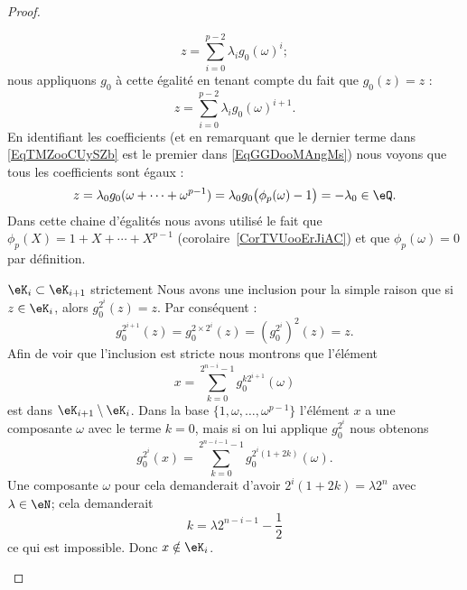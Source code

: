 \begin{proof}
\begin{subproof}
\begin{subproof}
			\begin{equation}    \label{EqTMZooCUySZb}
				z=\sum_{i=0}^{p-2}\lambda_i g_0(\omega)^i;
			\end{equation}
			nous appliquons \( g_0\) à cette égalité en tenant compte du fait que \( g_0(z)=z\) :
			\begin{equation}    \label{EqGGDooMAngMs}
				z=\sum_{i=0}^{p-2}\lambda_ig_0(\omega)^{i+1}.
			\end{equation}
			En identifiant les coefficients (et en remarquant que le dernier terme dans \eqref{EqTMZooCUySZb} est le premier dans \eqref{EqGGDooMAngMs}) nous voyons que tous les coefficients sont égaux :
			\begin{equation}
				z=\lambda_0g_0(\omega+\cdots +\omega^{p-1})=\lambda_0g_0\big( \phi_p(\omega)-1 \big)=-\lambda_0\in \eQ.
			\end{equation}
			Dans cette chaine d'égalités nous avons utilisé le fait que \( \phi_p(X)=1+X+\cdots +X^{p-1}\) (corolaire~\ref{CorTVUooErJiAC}) et que \( \phi_p(\omega)=0\) par définition.
			\item[\( \eK_i\subset \eK_{i+1}\) strictement]
			Nous avons une inclusion pour la simple raison que si \( z\in \eK_i\), alors \( g_0^{2^i}(z)=z\). Par conséquent :
			\begin{equation}
				g_0^{2^{i+1}}(z)=g_0^{2\times 2^i}(z)=(g_0^{2^i})^2(z)=z.
			\end{equation}
			Afin de voir que l'inclusion est stricte nous montrons que l'élément
			\begin{equation}\label{EqTBLooWpeGgk}
				x=\sum_{k=0}^{2^{n-i}-1}g_0^{k2^{i+1}}(\omega)
			\end{equation}
			est dans \( \eK_{i+1}\setminus \eK_i\). Dans la base \( \{ 1,\omega,\ldots, \omega^{p-1} \}\) l'élément \( x\) a une composante \( \omega\) avec le terme \( k=0\), mais si on lui applique \( g_0^{2^i}\) nous obtenons
			\begin{equation}
				g_0^{2^i}(x)=\sum_{k=0}^{2^{n-i-1}-1}g_0^{2^i(1+2k)}(\omega).
			\end{equation}
			Une composante \( \omega\) pour cela demanderait d'avoir \( 2^i(1+2k)=\lambda 2^n\) avec \( \lambda\in \eN\); cela demanderait
			\begin{equation}
				k=\lambda 2^{n-i-1}-\frac{ 1 }{2}
			\end{equation}
			ce qui est impossible. Donc \( x\notin \eK_{i}\).


\end{subproof}
\end{subproof}
\end{proof}

